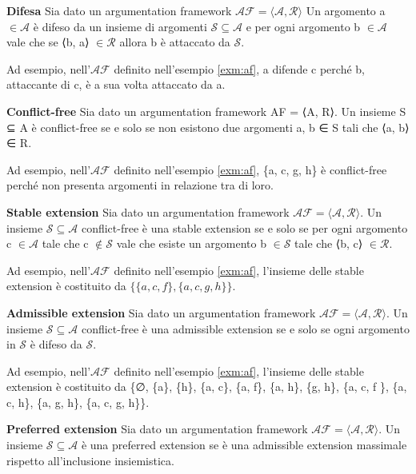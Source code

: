 \bigskip
\begin{defn} \textbf{Difesa} Sia dato un argumentation framework $\mathcal{AF = ⟨A, R⟩}$ Un argomento a $\mathcal{∈ A}$ è difeso da un insieme di argomenti $\mathcal{S ⊆ A} $ e per ogni argomento b  $\mathcal{∈ A}$ vale che se ⟨b, a⟩ $\mathcal{∈ R}$ allora b è attaccato da $\mathcal{S}$.
\end{defn}

Ad esempio, nell'$\mathcal{AF}$ definito nell'esempio \ref{exm:af}, {a} difende c perché b, attaccante di c, è a sua volta attaccato da a.

\bigskip
\begin{defn} \textbf{Conflict-free} Sia dato un argumentation framework AF =
⟨A, R⟩. Un insieme S ⊆ A è conflict-free se e solo se non esistono due argomenti a, b ∈ S tali che ⟨a, b⟩ ∈ R.
\end{defn}  

Ad esempio, nell'$\mathcal{AF}$ definito nell'esempio \ref{exm:af}, \{a, c, g, h\} è conflict-free perché non presenta argomenti in relazione tra di loro.

\bigskip
\begin{defn} \textbf{Stable extension} Sia dato un argumentation framework
$\mathcal{AF = ⟨A, R⟩}$. Un insieme $\mathcal{S ⊆ A}$ conflict-free è una stable extension se e solo se per ogni argomento c $\mathcal{∈ A}$ tale che c $\mathcal{∉ S}$ vale che esiste un argomento b $\mathcal{∈ S}$ tale che ⟨b, c⟩ $\mathcal{∈ R}$.
\end{defn}

Ad esempio, nell'$\mathcal{AF}$ definito nell'esempio \ref{exm:af}, l'insieme delle stable extension è costituito da $\{\{a, c, f \}, \{a, c, g, h\}\}$.

\bigskip
\begin{defn} \textbf{Admissible extension} Sia dato un argumentation framework $\mathcal{AF = ⟨A, R⟩}$. Un insieme $\mathcal{S ⊆ A}$ conflict-free è una admissible extension se e solo se ogni argomento in $\mathcal{S}$ è difeso da $\mathcal{S}$.
\label{adm-ext-dung}
\end{defn}

Ad esempio, nell'$\mathcal{AF}$ definito nell'esempio \ref{exm:af}, l'insieme delle stable extension è costituito da \{∅, \{a\}, \{h\}, \{a, c\}, \{a, f\}, \{a, h\}, \{g, h\}, \{a, c, f \}, \{a, c, h\}, \{a, g, h\},
\{a, c, g, h\}\}.

\bigskip
\begin{defn} \textbf{Preferred extension} Sia dato un argumentation framework $\mathcal{AF = ⟨A, R⟩}$. Un insieme $\mathcal{S ⊆ A}$ è una preferred extension se è una admissible
extension massimale rispetto all'inclusione insiemistica.
\end{defn}

